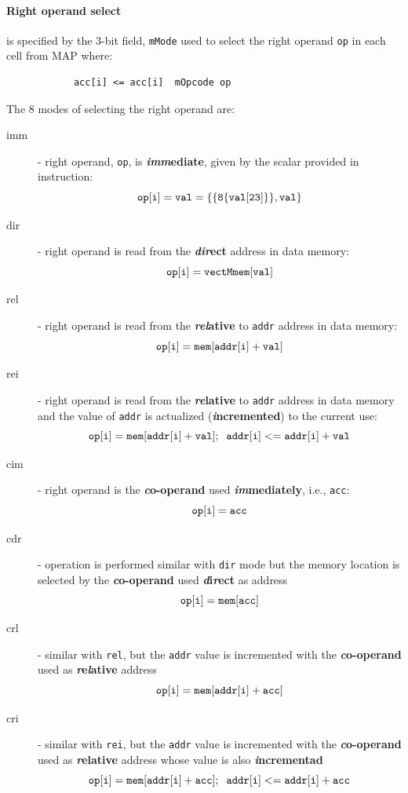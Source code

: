 
\paragraph{Right operand select} is specified by the 3-bit field,  {\tt mMode}  used to select the right operand  {\tt op} in each cell from MAP where:
\begin{verbatim}
            acc[i] <= acc[i]  mOpcode op
\end{verbatim}
The 8 modes of selecting the right operand are:
\begin{description}
    \item[imm] - right operand, {\tt op}, is {\bf {\em imm}ediate}, given by the scalar provided in instruction:
        $${\tt op[i] = val = \{\{8\{val[23]\}\}, val\}}$$
    \item[dir] - right operand is read from the {\bf {\em dir}ect} address in data memory:
         $${\tt op[i] = vectMmem[val]}$$
    \item[rel] - right operand is read from the {\bf {\em rel}ative} to {\tt addr} address in data memory:
         $${\tt op[i] = mem[addr[i] + val]}$$
    \item[rei] - right operand is read from the {\bf {\em re}lative} to {\tt addr} address in data memory and the value of {\tt addr} is actualized ({\bf {\em i}ncremented}) to the current use:
         $${\tt op[i]    = mem[addr[i] + val]; \;\; addr[i] <= addr[i] + val}$$
    \item[cim] - right operand is the {\bf {\em c}o-operand} used {\bf {\em im}mediately}, i.e., {\tt acc}:
        $${\tt op[i] = acc}$$
    \item[cdr] - operation is performed similar with {\tt dir} mode but the memory location is selected by the {\bf {\em c}o-operand} used {\bf {\em d}i{\em r}ect} as address
        $${\tt op[i] = mem[acc]}$$
     \item[crl] - similar with {\tt rel}, but the {\tt addr} value is incremented with the {\bf {\em c}o-operand} used as {\bf {\em r}e{\em l}ative} address
       $${\tt op[i] = mem[addr[i] + acc]}$$
     \item[cri] - similar with {\tt rei}, but the {\tt addr} value is incremented with the {\bf {\em c}o-operand} used as {\bf {\em r}elative} address whose value is also {\bf {\em i}ncrementad}
        $${\tt op[i] = mem[addr[i] + acc]; \;\; addr[i] <= addr[i] + acc}$$
\end{description}

